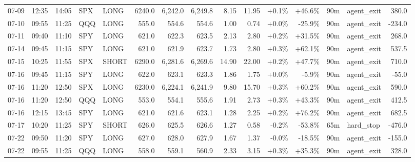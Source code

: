 \documentclass[11pt,a4paper,twoside]{article}
\begin{document}
\begin{landscape}
\begin{center}
\begin{longtable}{>{\color{txtmain}}l l l l l r r r r r r r r >{\color{txtmain}}l r}
07-09 & 12:35 & 14:05 & SPX & LONG & 6240.0 & 6,242.0 & 6,249.8 & 8.15 & 11.95 & \textcolor{wingreen}{+0.1\%} & \textcolor{wingreen}{+46.6\%} & 90m & agent\_exit & \textcolor{wingreen}{380.0} \\
07-10 & 09:55 & 11:25 & QQQ & LONG & 555.0 & 554.6 & 554.6 & 1.00 & 0.74 & \textcolor{wingreen}{+0.0\%} & \textcolor{lossred}{-25.9\%} & 90m & agent\_exit & \textcolor{lossred}{-234.0} \\
07-11 & 09:40 & 11:10 & SPY & LONG & 621.0 & 622.3 & 623.5 & 2.13 & 2.80 & \textcolor{wingreen}{+0.2\%} & \textcolor{wingreen}{+31.5\%} & 90m & agent\_exit & \textcolor{wingreen}{268.0} \\
07-14 & 09:45 & 11:15 & SPY & LONG & 621.0 & 621.9 & 623.7 & 1.73 & 2.80 & \textcolor{wingreen}{+0.3\%} & \textcolor{wingreen}{+62.1\%} & 90m & agent\_exit & \textcolor{wingreen}{537.5} \\
07-15 & 10:25 & 11:55 & SPX & SHORT & 6290.0 & 6,281.6 & 6,269.6 & 14.90 & 22.00 & \textcolor{wingreen}{+0.2\%} & \textcolor{wingreen}{+47.7\%} & 90m & agent\_exit & \textcolor{wingreen}{710.0} \\
07-16 & 09:45 & 11:15 & SPY & LONG & 622.0 & 623.1 & 623.3 & 1.86 & 1.75 & \textcolor{wingreen}{+0.0\%} & \textcolor{lossred}{-5.9\%} & 90m & agent\_exit & \textcolor{lossred}{-55.0} \\
07-16 & 11:20 & 12:50 & SPX & LONG & 6230.0 & 6,224.1 & 6,241.9 & 9.80 & 15.70 & \textcolor{wingreen}{+0.3\%} & \textcolor{wingreen}{+60.2\%} & 90m & agent\_exit & \textcolor{wingreen}{590.0} \\
07-16 & 11:20 & 12:50 & QQQ & LONG & 553.0 & 554.1 & 555.6 & 1.91 & 2.73 & \textcolor{wingreen}{+0.3\%} & \textcolor{wingreen}{+43.3\%} & 90m & agent\_exit & \textcolor{wingreen}{412.5} \\
07-16 & 12:15 & 13:45 & SPY & LONG & 621.0 & 621.6 & 623.1 & 1.28 & 2.25 & \textcolor{wingreen}{+0.2\%} & \textcolor{wingreen}{+76.2\%} & 90m & agent\_exit & \textcolor{wingreen}{682.5} \\
07-17 & 10:20 & 11:25 & SPY & SHORT & 626.0 & 625.5 & 626.6 & 1.27 & 0.58 & \textcolor{lossred}{-0.2\%} & \textcolor{lossred}{-53.8\%} & 65m & hard\_stop & \textcolor{lossred}{-476.0} \\
07-22 & 09:50 & 11:20 & SPY & LONG & 627.0 & 628.0 & 627.9 & 1.67 & 1.37 & \textcolor{lossred}{-0.0\%} & \textcolor{lossred}{-18.5\%} & 90m & agent\_exit & \textcolor{lossred}{-155.0} \\
07-22 & 09:55 & 11:25 & QQQ & LONG & 558.0 & 559.1 & 560.9 & 2.33 & 3.15 & \textcolor{wingreen}{+0.3\%} & \textcolor{wingreen}{+35.3\%} & 90m & agent\_exit & \textcolor{wingreen}{328.0} \\

\end{longtable}
\end{center}
\end{landscape}
\end{document}
